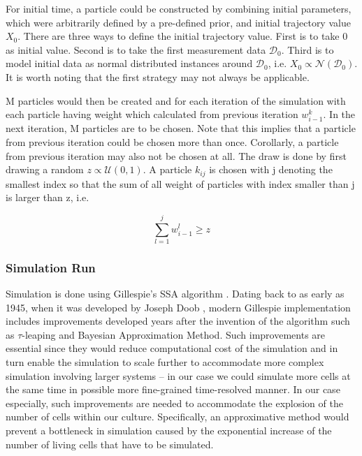\documentclass{bioinfo}
\begin{document}
For initial time, a particle could be constructed by combining initial parameters, which were arbitrarily defined by a pre-defined prior, and initial trajectory value $X_0$. There are three ways to define the initial trajectory value. First is to take 0 as initial value. Second is to take the first measurement data $\mathcal{D}_0$. Third is to model initial data as normal distributed instances around $\mathcal{D}_0$, i.e. $X_0 \propto \mathcal{N}(\mathcal{D}_0)$. It is worth noting that the first strategy may not always be applicable.

M particles would then be created and for each iteration of the simulation with each particle having weight which calculated from previous iteration $w_{i - 1}^k$. In the next iteration, M particles are to be chosen. Note that this implies that a particle from previous iteration could be chosen more than once. Corollarly, a particle from previous iteration may also not be chosen at all. The draw is done by first drawing a random $z \propto \mathcal{U}(0, 1)$. A particle $k_{ij}$ is chosen with j denoting the smallest index so that the sum of all weight of particles with index smaller than j is larger than z, i.e.

\begin{equation}
\sum_{l=1}^{j} w_{i - 1}^l \geq z\label{eq:14}
\end{equation}

\subsubsection{Simulation Run}

Simulation is done using Gillespie's SSA algorithm \citep{Gillespie77}. Dating back to as early as 1945, when it was developed by Joseph Doob \citealp{Doob45} \citealp{Chung67}, modern Gillespie implementation includes improvements developed years after the invention of the algorithm such as $\tau$-leaping and Bayesian Approximation Method. Such improvements are essential since they would reduce computational cost of the simulation and in turn enable the simulation to scale further to accommodate more complex simulation involving larger systems -- in our case we could simulate more cells at the same time in possible more fine-grained time-resolved manner. In our case especially, such improvements are needed to accommodate the explosion of the number of cells within our culture. Specifically, an approximative method would prevent a bottleneck in simulation caused by the exponential increase of the number of living cells that have to be simulated.\\
\end{document}
